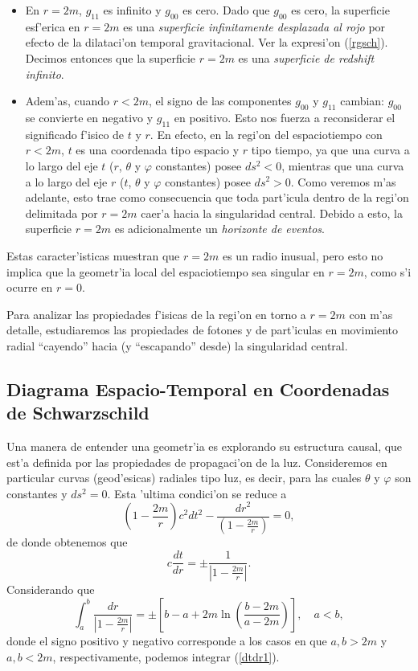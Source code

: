 \begin{itemize}
\item En $r=2m$, $g_{11}$ es infinito y $g_{00}$ es cero. Dado que $g_{00}
$ es cero, la superficie esf'erica en $r=2m$ es una \textit{superficie
infinitamente desplazada al rojo} por efecto de la dilataci'on temporal gravitacional. Ver la expresi'on (\ref{rgsch}). Decimos entonces que la superficie $r=2m$ es una \textit{superficie de redshift infinito}.

\item Adem'as, cuando $r<2m$, el signo de las componentes $g_{00}$ y $g_{11}$ cambian: $g_{00}$ se convierte en negativo y $g_{11}$ en positivo. Esto nos fuerza a reconsiderar el significado f'isico de $t$ y $r$. En efecto, en la regi'on del espaciotiempo con $r<2m$, $t$ es una coordenada tipo espacio y $r$ tipo tiempo, ya que una curva a lo largo del eje $t$ ($r$, $\theta$ y $\varphi$ constantes) posee $ds^2<0$, mientras que una curva a lo largo del eje $r$ ($t$, $\theta$ y $\varphi$ constantes) posee $ds^2>0$. Como veremos m'as adelante, esto trae como consecuencia que toda part'icula dentro de la regi'on delimitada por $r=2m$ caer'a hacia la singularidad central. Debido a esto, la superficie $r=2m$ es adicionalmente un \textit{horizonte de eventos}.
\end{itemize}

Estas caracter'isticas muestran que $r=2m$ es un radio inusual, pero
esto no implica que la geometr'ia local del espaciotiempo sea
singular en $r=2m$, como s'i ocurre en $r=0$.

Para analizar las propiedades f'isicas de la regi'on en torno a $r=2m$ con m'as detalle, estudiaremos las propiedades de fotones y de part'iculas en movimiento radial ``cayendo'' hacia (y ``escapando'' desde) la singularidad central.

\subsection{Diagrama Espacio-Temporal en Coordenadas de Schwarzschild}

Una manera de entender una geometr'ia es explorando su estructura causal, que est'a definida por las propiedades de propagaci'on de la luz. Consideremos en particular curvas (geod'esicas)
radiales tipo luz, es decir, para las cuales $\theta$ y $\varphi$ son constantes y
$ds^2=0$. Esta 'ultima condici'on se reduce a
\begin{equation}
 \left(1-\frac{2m}{r}\right) c^2dt^2-\frac{dr^2}{\left( 1-\frac
{2m}{r}\right) }=0,
\end{equation}
de donde obtenemos que
\begin{equation}
 c\frac{dt}{dr}=\pm\frac{1}{\left| 1-\frac{2m}{r}\right|}. \label{dtdr1}
\end{equation}
Considerando que
\begin{equation}
 \int_a^b\frac{dr}{\left| 1-\frac{2m}{r}\right|}=\pm\left[b-a+2m\ln\left(\frac{b-2m}{a-2m}\right)\right], \quad a<b,
\end{equation}
donde el signo positivo y negativo corresponde a los casos en que $a,b>2m$ y $a,b<2m$, respectivamente, podemos integrar (\ref{dtdr1}).


